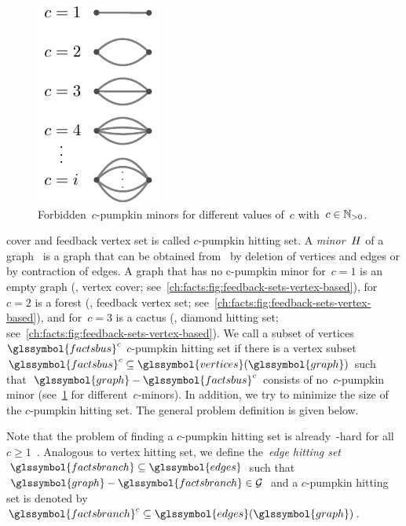 \begin{figure}%
    \includegraphics[scale=1,page=1]{factsplacement/figures/forbiddenMinors.pdf}%
    \caption{%
    Forbidden~$c$-pumpkin minors for different values of~$c$
    with~$c\in\mathbb{N}_{> 0}$.
    }%
    \label{ch:facts:fig:forbidden-pumpkin-minors}%
\end{figure}%
% 
\noindent%
cover and feedback vertex set is called $c$-pumpkin hitting set. A
\emph{minor}~$H$ of a graph~ is a graph that can be
obtained from~ by deletion of vertices and edges or by
contraction of edges. A graph that has no c-pumpkin minor for~$c = 1$ is an
empty graph (\ie, vertex cover;
see~\cref{ch:facts:fig:feedback-sets-vertex-based}), for~$c = 2$ is a
forest (\ie, feedback vertex set;
see~\cref{ch:facts:fig:feedback-sets-vertex-based}), and for~$c = 3$
is a cactus (\ie, diamond hitting set;
see~\cref{ch:facts:fig:feedback-sets-vertex-based}). We call a subset
of vertices~$\glssymbol{factsbus}^c$ $c$-pumpkin hitting set if there is a
vertex
subset~$
\glssymbol{factsbus}^c
\subseteq
\glssymbol{vertices}(\glssymbol{graph})
$ such that~$
\glssymbol{graph}
-
\glssymbol{factsbus}^c
% 
$ consists of no~$c$-pumpkin minor
(see~\cref{ch:facts:fig:forbidden-pumpkin-minors} for different~$c$-minors). In
addition, we try to minimize the size of the $c$-pumpkin hitting set. The
general problem definition is given below.
%
\begingroup
    
    \label{ch:facts:problem:c-pumkin-hitting-set}
\endgroup
% 
Note that the problem of finding a $c$-pumpkin hitting set is already~\NP-hard
for all~$c\geq 1$~\parencite{Jor11a,Jor11b}. Analogous to vertex hitting set, we
define the~\emph{edge hitting
set}~$\glssymbol{factsbranch}\subseteq\glssymbol{edges}$ such
that~$\glssymbol{graph} - \glssymbol{factsbranch}\in\mathcal\graph$ and a
$c$-pumpkin hitting set is denoted
by~$\glssymbol{factsbranch}^c\subseteq\glssymbol{edges}(
\glssymbol{graph})$.
% 
